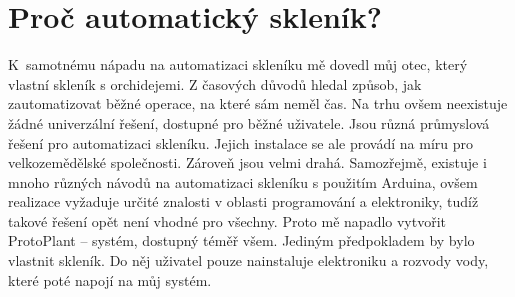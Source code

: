 \chapter{Proč automatický skleník?}
K~samotnému nápadu na automatizaci skleníku mě dovedl můj otec, který vlastní skleník s orchidejemi.
Z časových důvodů hledal způsob, jak zautomatizovat běžné operace, na které sám neměl čas.
Na trhu ovšem neexistuje žádné univerzální řešení, dostupné pro běžné uživatele.
Jsou různá průmyslová řešení pro automatizaci skleníku.
Jejich instalace se ale provádí na míru pro velkozemědělské společnosti.
Zároveň jsou velmi drahá.
Samozřejmě, existuje i mnoho různých návodů na automatizaci skleníku s použitím Arduina, ovšem realizace vyžaduje určité znalosti v oblasti programování a elektroniky, tudíž takové řešení opět není vhodné pro všechny. 
Proto mě napadlo vytvořit ProtoPlant -- systém, dostupný téměř všem. Jediným předpokladem by bylo vlastnit skleník. Do něj uživatel pouze nainstaluje elektroniku a rozvody vody, které poté napojí na můj systém.
